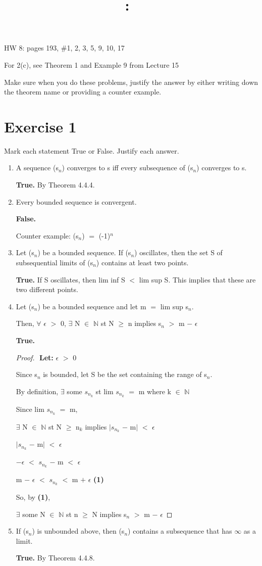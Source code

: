 \documentclass{article}
\title{
    \vspace{2in}
    \textmd{\textbf{\hmwkClass:\ \hmwkTitle}}\\
    \normalsize\vspace{0.1in}\small\vspace{0.1in}\large{\textit{\hmwkClassInstructor}}
    \vspace{3in}
}
\author{\hmwkAuthorName}
\date{}
\newcommand{\mt}[1]{\ensuremath{#1}}
\newcommand\bsc[2][\DefaultOpt]{%
  \def\DefaultOpt{#2}%
  \section[#1]{#2}%
}
\newcommand{\bgpf}{\begin{proof} $ $\newline}
\newcommand{\balist}{\begin{enumerate}[label=\alph*.]}
\newcommand{\elist}{\end{enumerate}}
\newcommand{\lt}[1]{\textbf{Let: } #1}
\newcommand{\bpth}[1]{\textbf{(#1)}}
\newcommand{\epf}{\end{proof}}
\newcommand{\dbs}[3]{\mt{#1_{#2_#3}}}
\newcommand{\bn}{\mt{\mathbb{N}} }       %
\newcommand{\ep}{\mt{\epsilon} }         %
\newcommand{\fa}{\mt{\forall} }          %
\newcommand{\mem}{\mt{\in} }
\newcommand{\exs}{\mt{\exists} }
\newcommand{\av}[1]{\mt{|}#1\mt{|}}  %
\newcommand{\prn}[1]{(#1)}
\newcommand{\ps}{\mt{+} }
\newcommand{\ms}{\mt{-} }
\newcommand{\ls}{\mt{<} }
\newcommand{\gr}{\mt{>} }
\newcommand{\gre}{\mt{\geq} }
\newcommand{\eql}{\mt{=} }
\newcommand{\uw}[2]{#1\mt{_{#2}}}
\newcommand{\uf}[2]{#1\mt{^{#2}}}
\newcommand{\infy}{\mt{\infty} }
\begin{document}
HW 8: pages 193, \#1, 2, 3, 5, 9, 10, 17

For 2(c), see Theorem 1 and Example 9 from Lecture 15

Make sure when you do these problems, justify the answer by either writing down the theorem name or providing a counter example.

\bsc{Exercise 1}{

Mark each statement True or False. Justify each answer.

\balist
\item A sequence \prn{\uw{s}{n}} converges to s iff every subsequence of (\uw{s}{n}) converges to s.
	
	\textbf{True.} By Theorem 4.4.4.
	
	
\item Every bounded sequence is convergent.
	
	\textbf{False.}
	
	Counter example: \prn{\uw{s}{n}} \eql \uf{(-1)}{n}
\item Let (\uw{s}{n}) be a bounded sequence. If \prn{\uw{s}{n}} oscillates, then the set S of subsequential limits of \prn{\uw{s}{n}} contains at least two points.

	\textbf{True.} If S oscillates, then lim inf S \ls lim sup S. This implies that these are two different points.
\item Let \prn{\uw{s}{n}} be a bounded sequence and let m \eql lim sup \uw{s}{n}.
	
	Then, \fa \ep \gr 0, \exs N \mem \bn st N \gre n implies \uw{s}{n} \gr m \ms \ep
	
	\textbf{True.}
	\bgpf
	\lt{\ep \gr 0}
	
	Since \uw{s}{n} is bounded, let S be the set containing the range of \uw{s}{n}.
	
	By definition, \exs some \dbs{s}{n}{k} st lim \dbs{s}{n}{k} \eql m where k \mem \bn 
	
	Since lim \dbs{s}{n}{k} \eql m,
	
	\exs N \mem \bn st N \gre \uw{n}{k} implies \av{\dbs{s}{n}{k} \ms m} \ls \ep
	
	\av{\dbs{s}{n}{k} \ms m} \ls \ep
	
	$-$\ep \ls \dbs{s}{n}{k} \ms m \ls \ep
	
	m \ms \ep \ls \dbs{s}{n}{k} \ls m \ps \ep \bpth{1}
	
	So, by \bpth{1},
	
	\exs some N \mem \bn st n \gre N implies \uw{s}{n} \gr m \ms \ep
	
	\epf
\item If \prn{\uw{s}{n}} is unbounded above, then \prn{\uw{s}{n}} contains a subsequence that has \infy as a limit.
	
	\textbf{True.} By Theorem 4.4.8.
\elist

}
\end{document}
